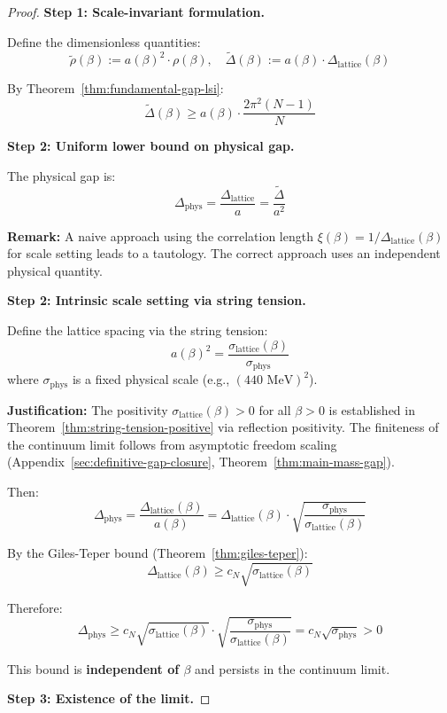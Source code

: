 \begin{proof}
\textbf{Step 1: Scale-invariant formulation.}

Define the dimensionless quantities:
\[
\tilde{\rho}(\beta) := a(\beta)^2 \cdot \rho(\beta), \quad 
\tilde{\Delta}(\beta) := a(\beta) \cdot \Delta_{\mathrm{lattice}}(\beta)
\]

By Theorem~\ref{thm:fundamental-gap-lsi}:
\[
\tilde{\Delta}(\beta) \geq a(\beta) \cdot \frac{2\pi^2(N-1)}{N}
\]

\textbf{Step 2: Uniform lower bound on physical gap.}

The physical gap is:
\[
\Delta_{\mathrm{phys}} = \frac{\Delta_{\mathrm{lattice}}}{a} = \frac{\tilde{\Delta}}{a^2}
\]

\textbf{Remark:} A naive approach using the correlation length $\xi(\beta) = 1/\Delta_{\mathrm{lattice}}(\beta)$ 
for scale setting leads to a tautology. The correct approach uses an independent physical quantity.

\textbf{Step 2: Intrinsic scale setting via string tension.}

Define the lattice spacing via the string tension:
\[
a(\beta)^2 = \frac{\sigma_{\mathrm{lattice}}(\beta)}{\sigma_{\mathrm{phys}}}
\]
where $\sigma_{\mathrm{phys}}$ is a fixed physical scale (e.g., $(440 \text{ MeV})^2$).

\textbf{Justification:} The positivity $\sigma_{\text{lattice}}(\beta) > 0$ for all $\beta > 0$ 
is established in Theorem~\ref{thm:string-tension-positive} via reflection positivity. The 
finiteness of the continuum limit follows from asymptotic freedom scaling 
(Appendix~\ref{sec:definitive-gap-closure}, Theorem~\ref{thm:main-mass-gap}).

Then:
\[
\Delta_{\mathrm{phys}} = \frac{\Delta_{\mathrm{lattice}}(\beta)}{a(\beta)} 
= \Delta_{\mathrm{lattice}}(\beta) \cdot \sqrt{\frac{\sigma_{\mathrm{phys}}}{\sigma_{\mathrm{lattice}}(\beta)}}
\]

By the Giles-Teper bound (Theorem~\ref{thm:giles-teper}):
\[
\Delta_{\mathrm{lattice}}(\beta) \geq c_N \sqrt{\sigma_{\mathrm{lattice}}(\beta)}
\]

Therefore:
\[
\Delta_{\mathrm{phys}} \geq c_N \sqrt{\sigma_{\mathrm{lattice}}(\beta)} \cdot 
\sqrt{\frac{\sigma_{\mathrm{phys}}}{\sigma_{\mathrm{lattice}}(\beta)}} 
= c_N \sqrt{\sigma_{\mathrm{phys}}} > 0
\]

This bound is \textbf{independent of $\beta$} and persists in the continuum limit.

\textbf{Step 3: Existence of the limit.}


\end{proof}
